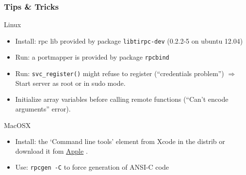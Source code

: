 \documentclass[bigger,hyperref={colorlinks=true, urlcolor=red, plainpages=false, pdfpagelabels, bookmarksnumbered}]{beamer}
\begin{document}
\begin{frame}
\frametitle{Tips \& Tricks}
\label{sec-2-23}
\begin{block}{Linux}
\label{sec-2-23-1}

\begin{itemize}
\item Install: rpc lib provided by package  \texttt{libtirpc-dev}  (0.2.2-5 on ubuntu 12.04)
\item Run: a portmapper is provided by package \texttt{rpcbind}
\item Run: \texttt{svc\_register()} might refuse to register (``credentials problem'') 
           $\Rightarrow$ Start server as root or in sudo mode.
\item Initialize array variables before calling remote functions 
     (``Can't encode arguments'' error).
\end{itemize}
\end{block}
\begin{block}{MacOSX}
\label{sec-2-23-2}

\begin{itemize}
\item Install: the `Command line tools' element from Xcode in the distrib
              or download it fom  \href{https://developer.apple.com/downloads/}{Apple} .
\item Use: \texttt{rpcgen -C} to force generation of ANSI-C code
\end{itemize}
   
\end{block}
\end{frame}
\end{document}
